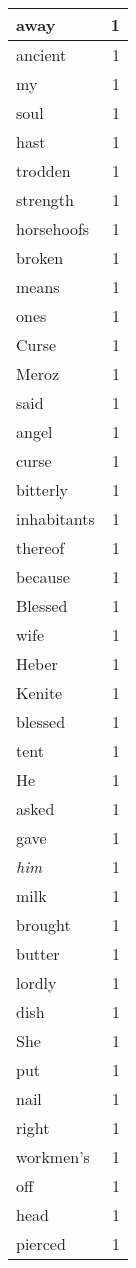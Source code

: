 \begin{center}
\begin{longtable}{l|r}
away & 1\\ \hline 
ancient & 1\\ \hline 
my & 1\\ \hline 
soul & 1\\ \hline 
hast & 1\\ \hline 
trodden & 1\\ \hline 
strength & 1\\ \hline 
horsehoofs & 1\\ \hline 
broken & 1\\ \hline 
means & 1\\ \hline 
ones & 1\\ \hline 
Curse & 1\\ \hline 
Meroz & 1\\ \hline 
said & 1\\ \hline 
angel & 1\\ \hline 
curse & 1\\ \hline 
bitterly & 1\\ \hline 
inhabitants & 1\\ \hline 
thereof & 1\\ \hline 
because & 1\\ \hline 
Blessed & 1\\ \hline 
wife & 1\\ \hline 
Heber & 1\\ \hline 
Kenite & 1\\ \hline 
blessed & 1\\ \hline 
tent & 1\\ \hline 
He & 1\\ \hline 
asked & 1\\ \hline 
gave & 1\\ \hline 
\emph{him} & 1\\ \hline 
milk & 1\\ \hline 
brought & 1\\ \hline 
butter & 1\\ \hline 
lordly & 1\\ \hline 
dish & 1\\ \hline 
She & 1\\ \hline 
put & 1\\ \hline 
nail & 1\\ \hline 
right & 1\\ \hline 
workmen's & 1\\ \hline 
off & 1\\ \hline 
head & 1\\ \hline 
pierced & 1\\ \hline 

\end{longtable}
\end{center}
